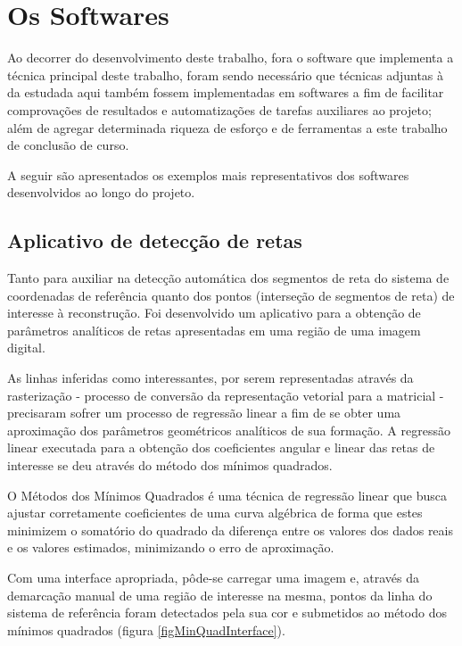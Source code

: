 \chapter{Os Softwares}
	\label{capituloSoftwares}

	Ao decorrer do desenvolvimento deste trabalho, fora o software que implementa a técnica principal deste trabalho, foram sendo necessário que técnicas adjuntas à da estudada aqui também fossem implementadas em softwares a fim de facilitar comprovações de resultados e automatizações de tarefas auxiliares ao projeto; além de agregar determinada riqueza de esforço e de ferramentas a este trabalho de conclusão de curso.
	
	A seguir são apresentados os exemplos mais representativos dos softwares desenvolvidos ao longo do projeto.
	
	\section{Aplicativo de detecção de retas}
		\label{appDeteccaoRetas}
		Tanto para auxiliar na detecção automática dos segmentos de reta do sistema de coordenadas de referência quanto dos pontos (interseção de segmentos de reta) de interesse à reconstrução. Foi desenvolvido um aplicativo para a obtenção de parâmetros analíticos de retas apresentadas em uma região de uma imagem digital.
		
		As linhas inferidas como interessantes, por serem representadas através da rasterização - processo de conversão da representação vetorial para a matricial \cite{compGrafTeoPrat} - precisaram sofrer um processo de regressão linear a fim de se obter uma aproximação dos parâmetros geométricos analíticos de sua formação. A regressão linear executada para a obtenção dos coeficientes angular e linear das retas de interesse se deu através do método dos mínimos quadrados.
	
	O Métodos dos Mínimos Quadrados é uma técnica de regressão linear que busca ajustar corretamente coeficientes de uma curva algébrica de forma que estes minimizem o somatório do quadrado da diferença entre os valores dos dados reais e os valores estimados, minimizando o erro de aproximação.
	
	Com uma interface apropriada, pôde-se carregar uma imagem e, através da demarcação manual de uma região de interesse na mesma, pontos da linha do sistema de referência foram detectados pela sua cor e submetidos ao método dos mínimos quadrados (figura \ref{figMinQuadInterface}).
	
